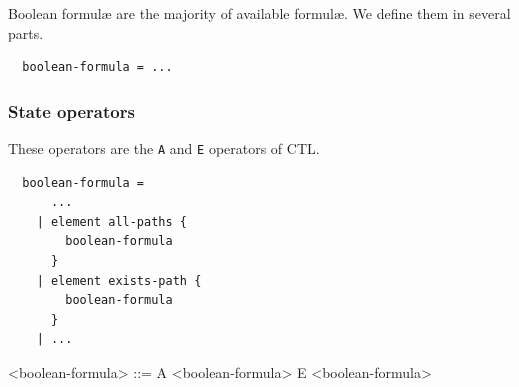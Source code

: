 \documentclass[10pt,english,a4paper]{article}
\begin{document}
Boolean formul{\ae} are the majority of available formul{\ae}.
We define them in several parts.

\begin{lstlisting}
  boolean-formula = ...
\end{lstlisting}




\subsubsection{State operators}

These operators are the \lstinline!A! and \lstinline!E! operators of CTL.

\begin{multicols}{2}
\begin{lstlisting}
  boolean-formula =
      ...
    | element all-paths {
        boolean-formula
      }
    | element exists-path {
        boolean-formula
      }
    | ...
\end{lstlisting}
\columnbreak
\scriptsize
\scriptsize\begin{grammar}
<boolean-formula> ::= A <boolean-formula>
\alt E <boolean-formula>
\end{grammar}
\end{multicols}
\end{document}
